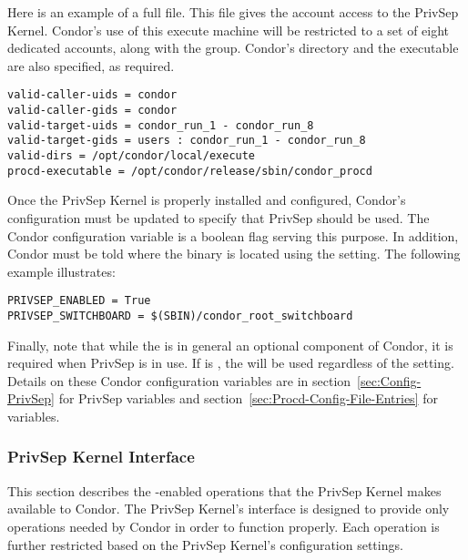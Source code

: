 Here is an example of a full  file.
This file gives the  account access to the PrivSep
Kernel. Condor's use of this execute machine will be restricted to a
set of eight dedicated accounts, along with the 
group. Condor's  directory and the 
executable are also specified, as required.
\begin{verbatim}
valid-caller-uids = condor
valid-caller-gids = condor
valid-target-uids = condor_run_1 - condor_run_8
valid-target-gids = users : condor_run_1 - condor_run_8
valid-dirs = /opt/condor/local/execute
procd-executable = /opt/condor/release/sbin/condor_procd
\end{verbatim}

Once the PrivSep Kernel is properly installed and configured, Condor's
configuration must be updated to specify that PrivSep should be
used. The Condor configuration variable  
is a boolean flag serving this purpose.
In addition, Condor must be told where the
 binary is located using the
 setting. The following example
illustrates:
\begin{verbatim}
PRIVSEP_ENABLED = True
PRIVSEP_SWITCHBOARD = $(SBIN)/condor_root_switchboard
\end{verbatim}

Finally, note that while the  is in general an optional
component of Condor, it is required when PrivSep is in use. If
 is , the  will be used
regardless of the  setting.
Details on these Condor configuration variables are in
section~\ref{sec:Config-PrivSep} for PrivSep variables
and 
section~\ref{sec:Procd-Config-File-Entries} for  variables.

\subsubsection{PrivSep Kernel Interface}

This section describes the -enabled operations that the
PrivSep Kernel makes available to Condor. The PrivSep Kernel's
interface is designed to provide only operations needed by Condor in
order to function properly. Each operation is further restricted based
on the PrivSep Kernel's configuration settings.

